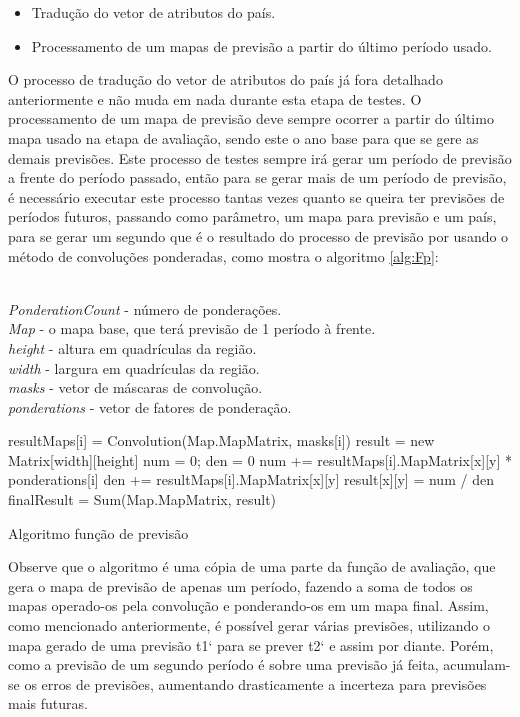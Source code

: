 \begin{itemize}
\item Tradução do vetor de atributos do país.
\item Processamento de um mapas de previsão a partir do último período usado.
\end{itemize}

O processo de tradução do vetor de atributos do país já fora detalhado anteriormente e não muda em nada durante esta etapa de testes. O processamento de um mapa de previsão deve sempre ocorrer a partir do último mapa usado na etapa de avaliação, sendo este o ano base para que se gere as demais previsões. Este processo de testes sempre irá gerar um período de previsão a frente do período passado, então para se gerar mais de um período de previsão, é necessário executar este processo tantas vezes quanto se queira ter previsões de períodos futuros, passando como parâmetro, um mapa para previsão e um país, para se gerar um segundo que é o resultado do processo de previsão por usando o método de convoluções ponderadas, como mostra o algoritmo \ref{alg:Fp}:

\begin{algorithm}[h]
\SetAlgoLined
\KwData
{
\\ \emph{PonderationCount} - número de ponderações.
\\ \emph{Map} - o mapa base, que terá previsão de 1 período à frente.
\\ \emph{height} - altura em quadrículas da região.
\\ \emph{width} - largura em quadrículas da região.
\\ \emph{masks} - vetor de máscaras de convolução.
\\ \emph{ponderations} - vetor de fatores de ponderação. 
}
 
  {
   	resultMaps[i] = Convolution(Map.MapMatrix, masks[i])\;
    }
     result = new Matrix[width][height]\;
     {
         {
           num = 0; den = 0\;
           {
 			num += resultMaps[i].MapMatrix[x][y] * ponderations[i]\;
             den += resultMaps[i].MapMatrix[x][y]\;
           }
           result[x][y] = num / den\;
         }
     }
     finalResult = Sum(Map.MapMatrix, result)\;
   
 \caption{Algoritmo função de previsão}
\label{alg:Fp}
\end{algorithm}

Observe que o algoritmo é uma cópia de uma parte da função de avaliação, que gera o mapa de previsão de apenas um período, fazendo a soma de todos os mapas operado-os pela convolução e ponderando-os em um mapa final. Assim, como mencionado anteriormente, é possível gerar várias previsões, utilizando o mapa gerado de uma previsão t1` para se prever t2` e assim por diante. Porém, como a previsão de um segundo período é sobre uma previsão já feita, acumulam-se os erros de previsões, aumentando drasticamente a incerteza para previsões mais futuras.


